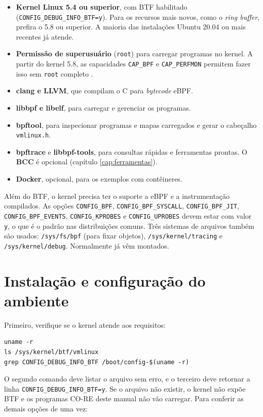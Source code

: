 \begin{itemize}
  \item \textbf{Kernel Linux 5.4 ou superior}, com BTF habilitado (\texttt{CONFIG\_DEBUG\_INFO\_BTF=y}). Para os recursos mais novos, como o \textit{ring buffer}, prefira o 5.8 ou superior. A maioria das instalações Ubuntu 20.04 ou mais recentes já atende.
  \item \textbf{Permissão de superusuário} (\texttt{root}) para carregar programas no kernel. A partir do kernel 5.8, as capacidades \texttt{CAP\_BPF} e \texttt{CAP\_PERFMON} permitem fazer isso sem \texttt{root} completo \cite{linuxkernel2024}.
  \item \textbf{clang e LLVM}, que compilam o C para \textit{bytecode} eBPF.
  \item \textbf{libbpf e libelf}, para carregar e gerenciar os programas.
  \item \textbf{bpftool}, para inspecionar programas e mapas carregados e gerar o cabeçalho \texttt{vmlinux.h}.
  \item \textbf{bpftrace} e \textbf{libbpf-tools}, para consultas rápidas e ferramentas prontas. O \textbf{BCC} é opcional (capítulo \ref{cap:ferramentas}).
  \item \textbf{Docker}, opcional, para os exemplos com contêineres.
\end{itemize}

Além do BTF, o kernel precisa ter o suporte a eBPF e a instrumentação compilados. As opções \texttt{CONFIG\_BPF}, \texttt{CONFIG\_BPF\_SYSCALL}, \texttt{CONFIG\_BPF\_JIT}, \texttt{CONFIG\_BPF\_EVENTS}, \texttt{CONFIG\_KPROBES} e \texttt{CONFIG\_UPROBES} devem estar com valor \texttt{y}, o que é o padrão nas distribuições comuns. Três sistemas de arquivos também são usados: \texttt{/sys/fs/bpf} (para fixar objetos), \texttt{/sys/kernel/tracing} e \texttt{/sys/kernel/debug}. Normalmente já vêm montados.

\section{Instalação e configuração do ambiente}

Primeiro, verifique se o kernel atende aos requisitos:

\begin{lstlisting}
uname -r
ls /sys/kernel/btf/vmlinux
grep CONFIG_DEBUG_INFO_BTF /boot/config-$(uname -r)
\end{lstlisting}

O segundo comando deve listar o arquivo sem erro, e o terceiro deve retornar a linha \texttt{CONFIG\_\allowbreak DEBUG\_\allowbreak INFO\_\allowbreak BTF=y}. Se o arquivo não existir, o kernel não expõe BTF e os programas CO-RE deste manual não vão carregar. Para conferir as demais opções de uma vez:

